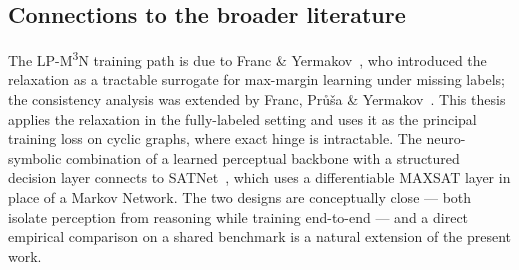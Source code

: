 \subsection{Connections to the broader literature}
\label{subsec:discussion-connections}

The LP-M\textsuperscript{3}N training path is due to
Franc \& Yermakov~\cite{franc2021}, who introduced the
relaxation as a tractable surrogate for max-margin learning
under missing labels; the consistency analysis was extended by
Franc, Pr\r{u}\v{s}a \& Yermakov~\cite{franc2022}. This thesis
applies the relaxation in the fully-labeled setting and uses
it as the principal training loss on cyclic graphs, where exact
hinge is intractable. The neuro-symbolic combination of a
learned perceptual backbone with a structured decision layer
connects to SATNet~\cite{wang2019satnet}, which uses a
differentiable MAXSAT layer in place of a Markov Network. The
two designs are conceptually close --- both isolate perception
from reasoning while training end-to-end --- and a direct
empirical comparison on a shared benchmark is a natural
extension of the present work.
